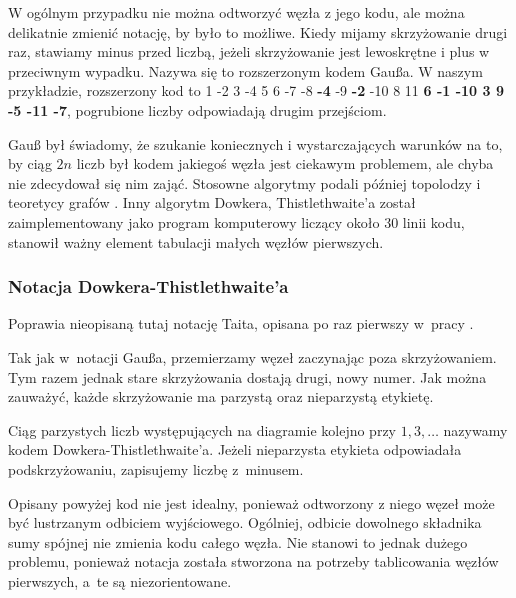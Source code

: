W ogólnym przypadku nie można odtworzyć węzła z jego kodu, ale można delikatnie zmienić notację, by było to możliwe.
Kiedy mijamy skrzyżowanie drugi raz, stawiamy minus przed liczbą, jeżeli skrzyżowanie jest lewoskrętne i plus w przeciwnym wypadku.
Nazywa się to rozszerzonym kodem Gaußa.
W naszym przykładzie, rozszerzony kod to 1 -2 3 -4 5 6 -7 -8 \textbf{-4} -9 \textbf{-2} -10 8 11 \textbf{6 -1 -10 3 9 -5 -11 -7}, pogrubione liczby odpowiadają drugim przejściom.

Gauß był świadomy, że szukanie koniecznych i wystarczających warunków na to, by ciąg $2n$ liczb był kodem jakiegoś węzła jest ciekawym problemem, ale chyba nie zdecydował się nim zająć.
Stosowne algorytmy podali później topolodzy \cite{dehn36} i teoretycy grafów \cite{rosenstiehl78}.
Inny algorytm Dowkera, Thistlethwaite'a \cite{dowker83} został zaimplementowany jako program komputerowy liczący około 30 linii kodu, stanowił ważny element tabulacji małych węzłów pierwszych.

%

\subsubsection{Notacja Dowkera-Thistlethwaite'a}
Poprawia nieopisaną tutaj notację Taita, opisana po raz pierwszy w~pracy \cite{dowker83}.
%
%

Tak jak w~notacji Gaußa, przemierzamy węzeł zaczynając poza skrzyżowaniem.
Tym razem jednak stare skrzyżowania dostają drugi, nowy numer.
Jak można zauważyć, każde skrzyżowanie ma parzystą oraz nieparzystą etykietę.

\begin{definition}
    Ciąg parzystych liczb występujących na diagramie kolejno przy $1, 3, \ldots$ nazywamy kodem Dowkera-Thistlethwaite'a.
    Jeżeli nieparzysta etykieta odpowiadała podskrzyżowaniu, zapisujemy liczbę z~minusem.
\end{definition}

Opisany powyżej kod nie jest idealny, ponieważ odtworzony z niego węzeł może być lustrzanym odbiciem wyjściowego.
Ogólniej, odbicie dowolnego składnika sumy spójnej nie zmienia kodu całego węzła.
Nie stanowi to jednak dużego problemu, ponieważ notacja została stworzona na potrzeby tablicowania węzłów pierwszych, a~te są niezorientowane.

